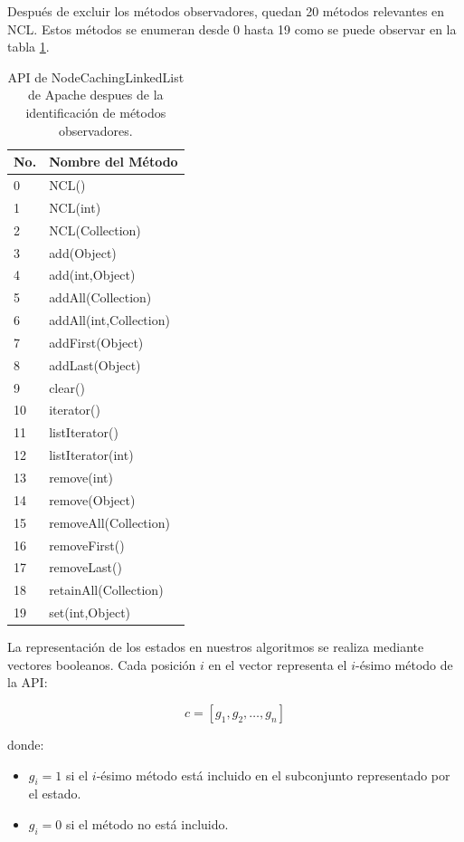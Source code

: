 Después de excluir los métodos observadores, quedan 20 métodos relevantes en NCL. Estos métodos se enumeran desde 0 hasta 19 como se puede observar en la tabla \ref{tab:ncl-api-infer}. 
\begin{table}[h!]
\centering
{\scriptsize
\begin{tabular}{|l|l|}
\hline
No. & Nombre del Método \\
\hline
0 & NCL() \\
1 & NCL(int) \\
2 & NCL(Collection) \\
3 & add(Object) \\
4 & add(int,Object) \\
5 & addAll(Collection) \\
6 & addAll(int,Collection) \\
7 & addFirst(Object) \\
8 & addLast(Object) \\
9 & clear() \\
10 & iterator() \\
11 & listIterator() \\
12 & listIterator(int) \\
13 & remove(int) \\
14 & remove(Object) \\
15 & removeAll(Collection) \\
16 & removeFirst() \\
17 & removeLast() \\
18 & retainAll(Collection) \\
19 & set(int,Object) \\
\hline
\end{tabular}
}
\caption{API de NodeCachingLinkedList de Apache despues de la identificación de métodos observadores.}
\label{tab:ncl-api-infer}
\end{table}

La representación de los estados en nuestros algoritmos se realiza mediante vectores booleanos. Cada posición $i$ en el vector representa el $i$-ésimo método de la API:

\[
c = [g_1, g_2, \ldots, g_n]
\]

donde:
\begin{itemize}
    \item $g_i = 1$ si el $i$-ésimo método está incluido en el subconjunto representado por el estado.
    \item $g_i = 0$ si el método no está incluido.
\end{itemize}

